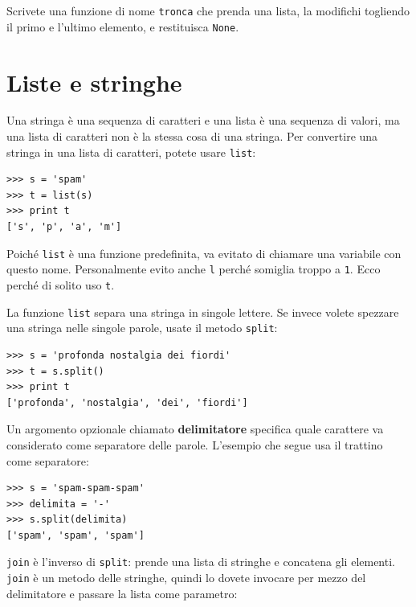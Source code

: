 \documentclass[10pt]{book}
\begin{document}
\vspace{0.2in}
\begin{exercise}

Scrivete una funzione di nome \verb"tronca" che prenda una lista, la modifichi togliendo il primo e l'ultimo elemento, e restituisca {\tt None}.

\end{exercise}


\section{Liste e stringhe}

Una stringa è una sequenza di caratteri e una lista è una sequenza di valori, ma una lista di caratteri non è la stessa cosa di una stringa. Per convertire una stringa in una lista di caratteri, potete usare {\tt list}:

\begin{verbatim}
>>> s = 'spam'
>>> t = list(s)
>>> print t
['s', 'p', 'a', 'm']
\end{verbatim}
%
Poiché {\tt list} è una funzione predefinita, va evitato di chiamare una variabile con questo nome. Personalmente evito anche {\tt l} perché somiglia troppo a {\tt 1}.  Ecco perché di solito uso {\tt t}.

La funzione {\tt list} separa una stringa in singole lettere. Se invece volete spezzare una stringa nelle singole parole, usate il metodo {\tt split}:

\begin{verbatim}
>>> s = 'profonda nostalgia dei fiordi'
>>> t = s.split()
>>> print t
['profonda', 'nostalgia', 'dei', 'fiordi']
\end{verbatim}
%
Un argomento opzionale chiamato {\bf delimitatore} specifica quale carattere va considerato come separatore delle parole. L'esempio che segue usa il trattino come separatore:

\begin{verbatim}
>>> s = 'spam-spam-spam'
>>> delimita = '-'
>>> s.split(delimita)
['spam', 'spam', 'spam']
\end{verbatim}
%
{\tt join} è l'inverso di {\tt split}: prende una lista di stringhe e concatena gli elementi.  {\tt join} è un metodo delle stringhe, quindi lo dovete invocare per mezzo del delimitatore e passare la lista come parametro:
\end{document}
